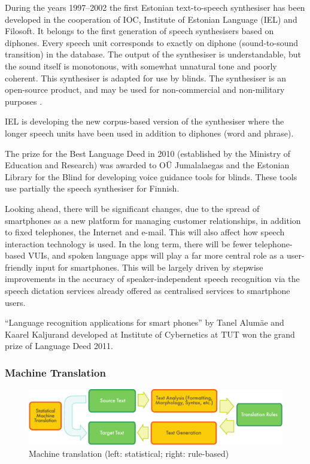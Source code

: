 \begin{multicols}{2}
During the years 1997--2002 the first Estonian text-to-speech synthesiser has been developed in the cooperation of IOC, Institute of Estonian Language (IEL) and Filosoft.  It belongs to the first generation of speech synthesisers based on diphones.  Every speech unit corresponds to exactly on diphone (sound-to-sound transition) in the database.  The output of the synthesiser is understandable, but the sound itself is monotonous, with somewhat unnatural tone and poorly coherent.  This synthesiser is adapted for use by blinds.  The synthesiser is an open-source product, and may be used for non-commercial and non-military purposes \cite{IEL}.

IEL is developing the new corpus-based version of the synthesiser where the longer speech units have been used in addition to diphones (word and phrase).

The prize for the Best Language Deed in 2010 (established by the Ministry of Education and Research) was awarded to OÜ Jumalalaegas and the Estonian Library for the Blind for developing voice guidance tools for blinds.  These tools use partially the speech synthesiser for Finnish.

Looking ahead, there will be significant changes, due to the spread of smartphones as a new platform for managing customer relationships, in addition to fixed telephones, the Internet and e-mail. This will also affect how speech interaction technology is used. In the long term, there will be fewer telephone-based VUIs, and spoken language apps will play a far more central role as a user-friendly input for smartphones. This will be largely driven by stepwise improvements in the accuracy of speaker-independent speech recognition via the speech dictation services already offered as centralised services to smartphone users. 

``Language recognition applications for smart phones'' by Tanel Alumäe and Kaarel Kaljurand developed at Institute of Cybernetics at TUT won the grand prize of Language Deed 2011.

\subsubsection{Machine Translation}

\begin{figure}[htb]
  \center
  \includegraphics[width=\textwidth]{../_media/english/machine_translation}
  \caption{Machine translation (left: statistical; right: rule-based)}
\label{fig:mtarch_en}
\end{figure}


\end{multicols}
